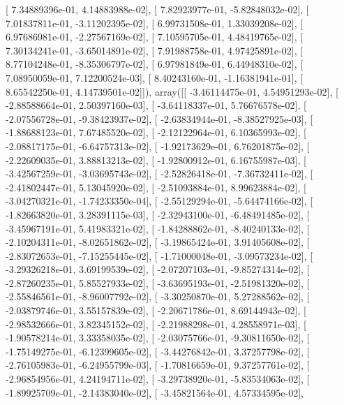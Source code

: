 \documentclass{article}
\begin{document}
       [  7.34889396e-01,   4.14883988e-02],
       [  7.82923977e-01,  -5.82848032e-02],
       [  7.01837811e-01,  -3.11202395e-02],
       [  6.99731508e-01,   1.33039208e-02],
       [  6.97686981e-01,  -2.27567169e-02],
       [  7.10595705e-01,   4.48419765e-02],
       [  7.30134241e-01,  -3.65014891e-02],
       [  7.91988758e-01,   4.97425891e-02],
       [  8.77104248e-01,  -8.35306797e-02],
       [  6.97981849e-01,   6.44948310e-02],
       [  7.08950059e-01,   7.12200524e-03],
       [  8.40243160e-01,  -1.16381941e-01],
       [  8.65542250e-01,   4.14739501e-02]]), array([[ -3.46114475e-01,   4.54951293e-02],
       [ -2.88588664e-01,   2.50397160e-03],
       [ -3.64118337e-01,   5.76676578e-02],
       [ -2.07556728e-01,  -9.38423937e-02],
       [ -2.63834944e-01,  -8.38527925e-03],
       [ -1.88688123e-01,   7.67485520e-02],
       [ -2.12122964e-01,   6.10365993e-02],
       [ -2.08817175e-01,  -6.64757313e-02],
       [ -1.92173629e-01,   6.76201875e-02],
       [ -2.22609035e-01,   3.88813213e-02],
       [ -1.92800912e-01,   6.16755987e-03],
       [ -3.42567259e-01,  -3.03695743e-02],
       [ -2.52826418e-01,  -7.36732411e-02],
       [ -2.41802447e-01,   5.13045920e-02],
       [ -2.51093884e-01,   8.99623884e-02],
       [ -3.04270321e-01,  -1.74233350e-04],
       [ -2.55129294e-01,  -5.64474166e-02],
       [ -1.82663820e-01,   3.28391115e-03],
       [ -2.32943100e-01,  -6.48491485e-02],
       [ -3.45967191e-01,   5.41983321e-02],
       [ -1.84288862e-01,  -8.40240133e-02],
       [ -2.10204311e-01,  -8.02651862e-02],
       [ -3.19865424e-01,   3.91405608e-02],
       [ -2.83072653e-01,  -7.15255445e-02],
       [ -1.71000048e-01,  -3.09573234e-02],
       [ -3.29326218e-01,   3.69199539e-02],
       [ -2.07207103e-01,  -9.85274314e-02],
       [ -2.87260235e-01,   5.85527933e-02],
       [ -3.63695193e-01,  -2.51981320e-02],
       [ -2.55846561e-01,  -8.96007792e-02],
       [ -3.30250870e-01,   5.27288562e-02],
       [ -2.03879746e-01,   3.55157839e-02],
       [ -2.20671786e-01,   8.69144943e-02],
       [ -2.98532666e-01,   3.82345152e-02],
       [ -2.21988298e-01,   4.28558971e-03],
       [ -1.90578214e-01,   3.33358035e-02],
       [ -2.03075766e-01,  -9.30811650e-02],
       [ -1.75149275e-01,  -6.12399605e-02],
       [ -3.44276842e-01,   3.37257798e-02],
       [ -2.76105983e-01,  -6.24955799e-03],
       [ -1.70816659e-01,   9.37257761e-02],
       [ -2.96854956e-01,   4.24194711e-02],
       [ -3.29738920e-01,  -5.83534063e-02],
       [ -1.89925709e-01,  -2.14383040e-02],
       [ -3.45821564e-01,   4.57334595e-02],
\end{document}

